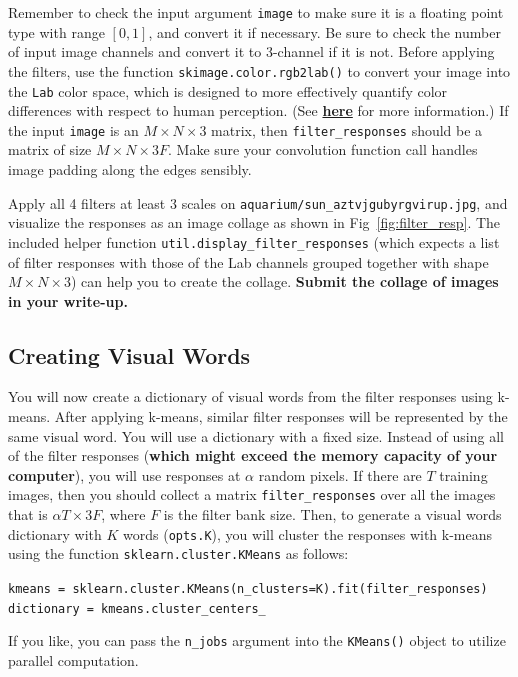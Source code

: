 \documentclass[10pt]{article}
\begin{document}
Remember to check the input argument {\tt image} to make sure it is a floating point type with range $[0, 1]$, and convert it if necessary. Be sure to check the number of input image channels and convert it to 3-channel if it is not. Before applying the filters, use the function {\tt skimage.color.rgb2lab()} to convert your image into the {\tt Lab} color space, which is designed to more effectively quantify color differences with respect to human perception. (See {\bf \href{https://en.wikipedia.org/wiki/CIELAB_color_space}{here}} for more information.) If the input {\tt image} is an $M \times N \times 3$ matrix, then {\tt filter\_responses} should be a matrix of size $M \times N \times 3F$. Make sure your convolution function call handles image padding along the edges sensibly.

Apply all 4 filters at least 3 scales on {\tt aquarium/sun\_aztvjgubyrgvirup.jpg}, and visualize the responses as an image collage as shown in Fig~\ref{fig:filter_resp}.
The included helper function {\tt util.display\_filter\_responses} (which expects a list of filter responses with those of the Lab channels grouped together with shape $M \times N \times 3$) can help you to create the collage.
{\bf Submit the collage of images in your write-up.}

\subsection{Creating Visual Words}
You will now create a dictionary of visual words from the filter responses using k-means. After applying k-means, similar filter responses will be represented by the same visual word. You will use a dictionary with a fixed size. Instead of using all of the filter responses ({\bf which might exceed the memory capacity of your computer}), you will use responses at $\alpha$ random pixels. If there are $T$ training images, then you should collect a matrix {\tt filter\_responses} over all the images that is $\alpha T \times 3F$, where $F$ is the filter bank size.
Then, to generate a visual words dictionary with $K$ words ({\tt opts.K}), you will cluster the responses with k-means using the function {\tt sklearn.cluster.KMeans} as follows:
\begin{center}
    {\tt kmeans = sklearn.cluster.KMeans(n\_clusters=K).fit(filter\_responses) \\
    dictionary = kmeans.cluster\_centers\_ }
\end{center}
If you like, you can pass the {\tt n\_jobs} argument into the {\tt KMeans()} object to utilize parallel computation. \\
\end{document}
